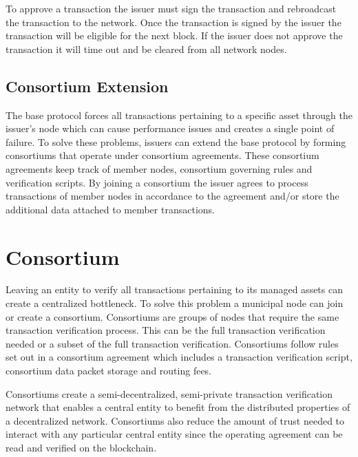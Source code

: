 \documentclass[12pt]{article}
\begin{document}
To approve a transaction the issuer must sign the transaction and rebroadcast 
the transaction to the network. Once the transaction is signed by the issuer
the transaction will be eligible for the next block.  
If the issuer does not approve the transaction it will
time out and be cleared from all network nodes.

\subsection{Consortium Extension}

The base protocol forces all transactions pertaining to a specific asset through 
the issuer's node which can cause performance issues and creates a single point 
of failure.  To solve these problems, issuers can extend the base protocol by 
forming consortiums that operate under consortium agreements.  These consortium 
agreements keep track of member nodes, consortium governing rules and 
verification scripts.  By joining a consortium the issuer agrees to process 
transactions of member nodes in accordance to the agreement and/or store 
the additional data attached to member transactions.

\section{Consortium}

Leaving an entity to verify all transactions pertaining to its managed assets can create 
a centralized bottleneck.  To solve this problem a municipal node can join or create a consortium.  
Consortiums are groups of nodes that require the same transaction verification process.  
This can be the full transaction verification needed or a subset of the full transaction verification. 
Consortiums follow rules set out in a consortium agreement which includes a transaction 
verification script, consortium data packet storage and routing fees.

Consortiums create a semi-decentralized, semi-private transaction verification network that 
enables a central entity to benefit from the distributed properties of a decentralized network.  
Consortiums also reduce the amount of trust needed to interact with any particular central 
entity since the operating agreement can be read and verified on the blockchain.
\end{document}
